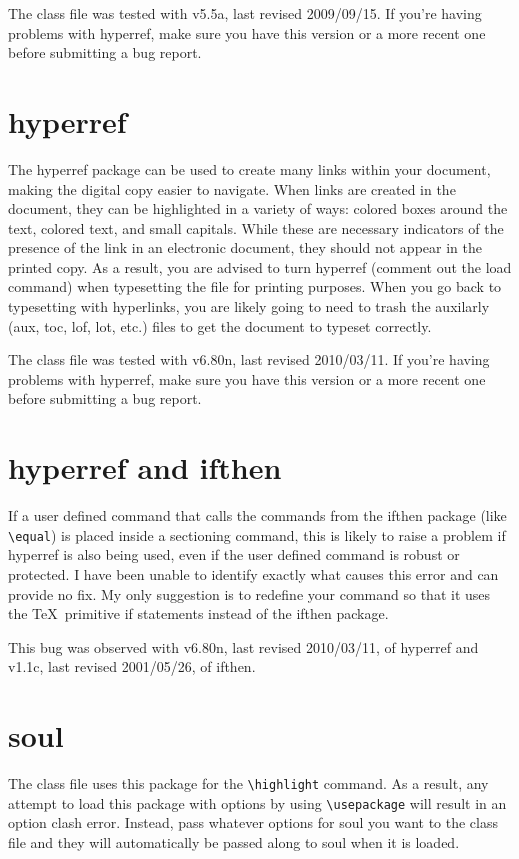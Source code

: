 The class file was tested with v5.5a, last revised 2009/09/15.  If you're having problems with hyperref, make sure you have this version or a more recent one before submitting a bug report.

\section{hyperref}
The hyperref package can be used to create many links within your document, making the digital copy easier to navigate.  When links are created in the document, they can be highlighted in a variety of ways: colored boxes around the text, colored text, and small capitals.  While these are necessary indicators of the presence of the link in an electronic document, they should not appear in the printed copy.  As a result, you are advised to turn hyperref (comment out the load command) when typesetting the file for printing purposes.  When you go back to typesetting with hyperlinks, you are likely going to need to trash the auxilarly (aux, toc, lof, lot, etc.) files to get the document to typeset correctly.

The class file was tested with v6.80n, last revised 2010/03/11.  If you're having problems with hyperref, make sure you have this version or a more recent one before submitting a bug report.

\section{hyperref and ifthen}
If a user defined command that calls the commands from the ifthen package (like \verb=\equal=) is placed inside a sectioning command, this is likely to raise a problem if hyperref is also being used, even if the user defined command is robust or protected.  I have been unable to identify exactly what causes this error and can provide no fix.  My only suggestion is to redefine your command so that it uses the \TeX\ primitive if statements instead of the ifthen package.

This bug was observed with v6.80n, last revised 2010/03/11, of hyperref and v1.1c, last revised 2001/05/26, of ifthen.

\section{soul}
The class file uses this package for the \verb=\highlight= command.  As a result, any attempt to load this package with options by using \verb=\usepackage= will result in an option clash error.  Instead, pass whatever options for soul you want to the class file and they will automatically be passed along to soul when it is loaded.

